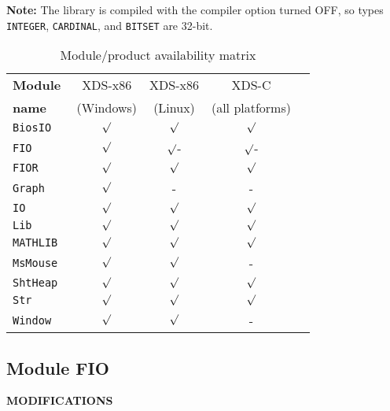 {\bf Note:} The library is compiled with the  compiler option
turned OFF, so types \verb'INTEGER', \verb'CARDINAL', and \verb'BITSET' 
are 32-bit.

\begin{table}[htbp]
\begin{center}
\begin{tabular}{|l|c|c|c|c|}
\hline
\bf Module & XDS-x86     & XDS-x86  & XDS-C \\
\bf name   & (Windows)   & (Linux)  & (all platforms) \\
\hline
\tt BiosIO     & $\surd$ & $\surd$  & $\surd$ \\
\tt FIO        & $\surd$ & $\surd$- & $\surd$- \\
\tt FIOR       & $\surd$ & $\surd$  & $\surd$ \\
\tt Graph      & $\surd$ & -        & - \\
\tt IO         & $\surd$ & $\surd$  & $\surd$ \\
\tt Lib        & $\surd$ & $\surd$  & $\surd$ \\
\tt MATHLIB    & $\surd$ & $\surd$  & $\surd$ \\
\tt MsMouse    & $\surd$ & $\surd$  & - \\
\tt ShtHeap    & $\surd$ & $\surd$  & $\surd$ \\
\tt Str        & $\surd$ & $\surd$  & $\surd$ \\
\tt Window     & $\surd$ & $\surd$  & - \\
\hline
\end{tabular}
\caption{Module/product availability matrix}
\label{tscp:matrix}
\end{center}
\end{table}


\subsection{Module FIO}

{\bf MODIFICATIONS}

